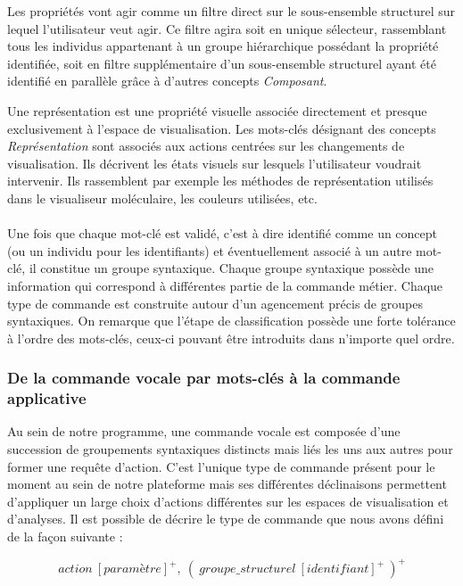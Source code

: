 Les propriétés vont agir comme un filtre direct sur le sous-ensemble structurel sur lequel l'utilisateur veut agir. Ce filtre agira soit en unique sélecteur, rassemblant tous les individus appartenant à un groupe hiérarchique possédant la propriété identifiée, soit en filtre supplémentaire d'un sous-ensemble structurel ayant été identifié en parallèle grâce à d'autres concepts \textit{Composant}.


Une représentation est une propriété visuelle associée directement et presque exclusivement à l'espace de visualisation. Les mots-clés désignant des concepts \textit{Représentation} sont associés aux actions centrées sur les changements de visualisation. Ils décrivent les états visuels sur lesquels l'utilisateur voudrait intervenir. Ils rassemblent par exemple les méthodes de représentation utilisés dans le visualiseur moléculaire, les couleurs utilisées, etc.
\\
\\
Une fois que chaque mot-clé est validé, c'est à dire identifié comme un concept (ou un individu pour les identifiants) et éventuellement associé à un autre mot-clé, il constitue un groupe syntaxique. Chaque groupe syntaxique possède une information qui correspond à différentes partie de la commande métier. Chaque type de commande est construite autour d'un agencement précis de groupes syntaxiques. On remarque que l'étape de classification possède une forte tolérance à l'ordre des mots-clés, ceux-ci pouvant être introduits dans n'importe quel ordre.


\subsubsection{De la commande vocale par mots-clés à la commande applicative} \label{command}

Au sein de notre programme, une commande vocale est composée d'une succession de groupements syntaxiques distincts mais liés les uns aux autres pour former une requête d'action. C'est l'unique type de commande présent pour le moment au sein de notre plateforme mais ses différentes déclinaisons permettent d'appliquer un large choix d'actions différentes sur les espaces de visualisation et d'analyses. Il est possible de décrire le type de commande que nous avons défini de la façon suivante :

$$action\ [paramètre]^+,\ (\ groupe\_structurel\ [identifiant]^+\ )^+$$

